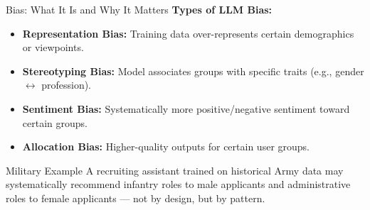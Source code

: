 \documentclass{beamer}       %
\begin{document}
\begin{frame}{Bias: What It Is and Why It Matters}
    \small
    \textbf{Types of LLM Bias:}
    \begin{itemize}
        \item \textbf{Representation Bias:} Training data over-represents certain demographics or viewpoints.
        \item \textbf{Stereotyping Bias:} Model associates groups with specific traits (e.g., gender $\leftrightarrow$ profession).
        \item \textbf{Sentiment Bias:} Systematically more positive/negative sentiment toward certain groups.
        \item \textbf{Allocation Bias:} Higher-quality outputs for certain user groups.
    \end{itemize}
    \vfill
    \begin{alertblock}{Military Example}
        \small A recruiting assistant trained on historical Army data may systematically recommend infantry roles to male applicants and administrative roles to female applicants --- not by design, but by pattern.
    \end{alertblock}
\end{frame}
\end{document}
